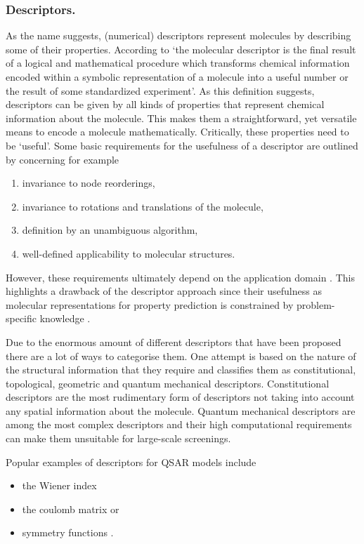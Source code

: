 \subsubsection*{Descriptors.}
As the name suggests, (numerical) descriptors represent molecules by describing some of their properties. According to \cite{todeschini2008handbook} `the molecular descriptor is the final result of a logical and mathematical procedure which transforms chemical information encoded within a symbolic representation of a molecule into a useful number or the result of some standardized experiment'. As this definition suggests, descriptors can be given by all kinds of properties that represent chemical information about the molecule. This makes them a straightforward, yet versatile means to encode a molecule mathematically. Critically, these properties need to be `useful'. Some basic requirements for the usefulness of a descriptor are outlined by \cite{Mauri2016} concerning for example
\begin{enumerate}
	\item invariance to node reorderings,
	\item invariance to rotations and translations of the molecule,
	\item definition by an unambiguous algorithm,
	\item well-defined applicability to molecular structures.
\end{enumerate}
However, these requirements ultimately depend on the application domain \citep{jiang}. This highlights a drawback of the descriptor approach since their usefulness as molecular representations for property prediction is constrained by  problem-specific knowledge \citep{SHEN201929}. 

Due to the enormous amount of different descriptors that have been proposed there are a lot of ways to categorise them. One attempt is based on the nature of the structural information that they require \citep{descript} and classifies them as constitutional, topological, geometric and quantum mechanical descriptors. Constitutional descriptors are the most rudimentary form of descriptors not taking into account any spatial information about the molecule. Quantum mechanical descriptors are among the most complex descriptors and their high computational requirements can make them unsuitable for large-scale screenings. 

Popular examples of descriptors for QSAR models include \begin{itemize}
	\item the Wiener index \citep{wiener1947structural, nikolic2001wiener}
	\item the coulomb matrix \citep{coulumb} or
	\item symmetry functions \citep{symfunc}.
\end{itemize}

